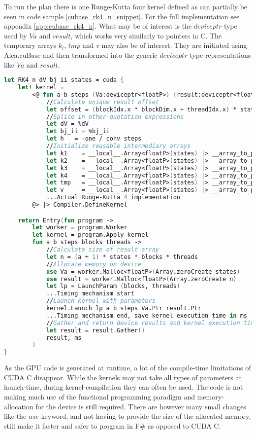 To run the plan there is one Runge-Kutta four kernel defined as can partially be seen in code sample \ref{cubase_rk4_n_snippet}. 
For the full implementation see appendix \ref{app:cubase_rk4_n}. 
What may be of interest is the $deviceptr$ type used by $Va$ and $result$, which works very similarly to pointers in C.
The temporary arrays $k_i$, $tmp$ and $v$ may also be of interest. 
They are initiated using Alea.cuBase and then transformed into the generic $deviceptr$ type representations like $Va$ and $result$.
\clearpage
\begin{lstlisting}[language=FSharp, caption=The Runge-Kutta four solver expressed in F\# Alea.cuBase, label=cubase_rk4_n_snippet]
let RK4_n dV bj_ii states = cuda {
	let! kernel =
		<@ fun a b steps (Va:deviceptr<floatP>) (result:deviceptr<floatP>) ->
			//Calculate unique result offset
			let offset = (blockIdx.x * blockDim.x + threadIdx.x) * states * (a + 1)
            //Splice in other quotation expressions
			let dV = %dV
			let bj_ii = %bj_ii
			let h   = -one / conv steps
			//Initialize reusable intermediary arrays
			let k1	  = __local__.Array<floatP>(states) |> __array_to_ptr
			let k2	  = __local__.Array<floatP>(states) |> __array_to_ptr
			let k3	  = __local__.Array<floatP>(states) |> __array_to_ptr
			let k4	  = __local__.Array<floatP>(states) |> __array_to_ptr
			let tmp	  = __local__.Array<floatP>(states) |> __array_to_ptr
			let v	  = __local__.Array<floatP>(states) |> __array_to_ptr
            ...Actual Runge-Kutta 4 implementation
        @> |> Compiler.DefineKernel 

    return Entry(fun program ->
        let worker = program.Worker
        let kernel = program.Apply kernel
        fun a b steps blocks threads ->
            //Calculate size of result array
            let n = (a + 1) * states * blocks * threads
            //Allocate memory on device
            use Va = worker.Malloc<floatP>(Array.zeroCreate states)
            use result = worker.Malloc<floatP>(Array.zeroCreate n)
            let lp = LaunchParam (blocks, threads)
            ...Timing mechanism start
            //Launch kernel with parameters
            kernel.Launch lp a b steps Va.Ptr result.Ptr
            ...Timing mechanism end, save kernel execution time in ms
            //Gather and return device results and kernel execution time
            let result = result.Gather()
            result, ms
        )
}
\end{lstlisting}

As the GPU code is generated at runtime, a lot of the compile-time limitations of CUDA C disappear.
While the kernels may not take all types of parameters at launch-time, during kernel-compilation they can often be used.
The code is not making much use of the functional programming paradigm and memory-allocation for the device is still required.
There are however many small changes like the $use$ keyword, and not having to provide the size of the allocated memory, still make it faster and safer to program in F\# as opposed to CUDA C.

